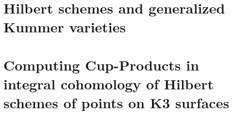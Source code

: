 \documentclass[11pt,twoside]{article}
\newcommand{\chapter}[1]{}
\begin{document}
\part{Hilbert schemes and generalized Kummer varieties}
\chapter{Cohomology of Hilbert schemes of points on surfaces}






\label{integralcohomology}
\chapter{Cohomology of generalized Kummer manifolds}




\chapter{A quotient of the generalized Kummer fourfold}

\newpage
\part{Computing Cup-Products in integral cohomology of Hilbert schemes of points on K3 surfaces}
\chapter{Integral cohomology of \texorpdfstring{$S\hilb{n}$}{S[n]}}



\appendix
\chapter{Source code}




\newpage

\end{document}
